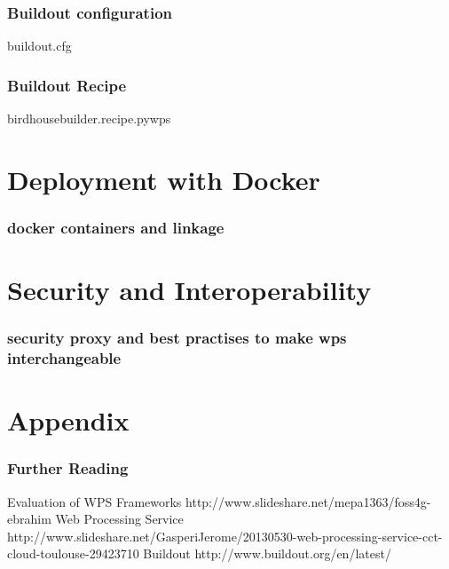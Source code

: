 \documentclass{beamer}
\begin{document}
  \begin{frame}[shrink]
    \frametitle{Buildout configuration}
    \begin{block}{buildout.cfg}
      
    \end{block}
\end{frame}

  \begin{frame}[shrink]
    \frametitle{Buildout Recipe}
    \begin{block}{birdhousebuilder.recipe.pywps}
      
    \end{block}
\end{frame}


  \section{Deployment with Docker}

  \begin{frame}
    \frametitle{docker containers and linkage}
  \end{frame}


  \section{Security and Interoperability}

  \begin{frame}
    \frametitle{security proxy and best practises to make wps interchangeable}
  \end{frame}

  \appendix

  \section{Appendix}
  
   \begin{frame}[allowframebreaks]
    \frametitle<presentation>{Further Reading}    
    \begin{thebibliography}{10}    
      \beamertemplatearticlebibitems
      Evaluation of WPS Frameworks
      \newblock http://www.slideshare.net/mepa1363/foss4g-ebrahim
      Web Processing Service
      \newblock http://www.slideshare.net/GasperiJerome/20130530-web-processing-service-cct-cloud-toulouse-29423710
      Buildout
      \newblock http://www.buildout.org/en/latest/
    \end{thebibliography}
    
  \end{frame}
  
\end{document}
